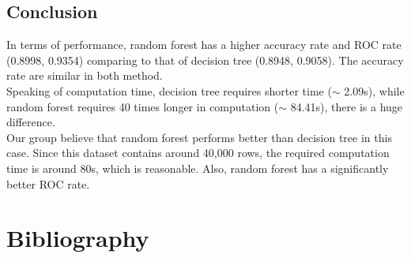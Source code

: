 \documentclass[11pt,a4paper]{article}
\begin{document}
    \subsection{Conclusion}
    In terms of performance, random forest has a higher accuracy rate and ROC rate (0.8998, 0.9354) comparing to that of decision tree (0.8948, 0.9058). The accuracy rate are similar in both method. \\
    Speaking of computation time, decision tree requires shorter time ($\sim$ 2.09s), while random forest requires 40 times longer in computation ($\sim$ 84.41s), there is a huge difference. \\
    Our group believe that random forest performs better than decision tree in this case. Since this dataset contains around 40,000 rows, the required computation time is around 80s, which is reasonable. Also, random forest has a significantly better ROC rate.
    
    
    \newpage
    \section{Bibliography}
    
\end{document}
